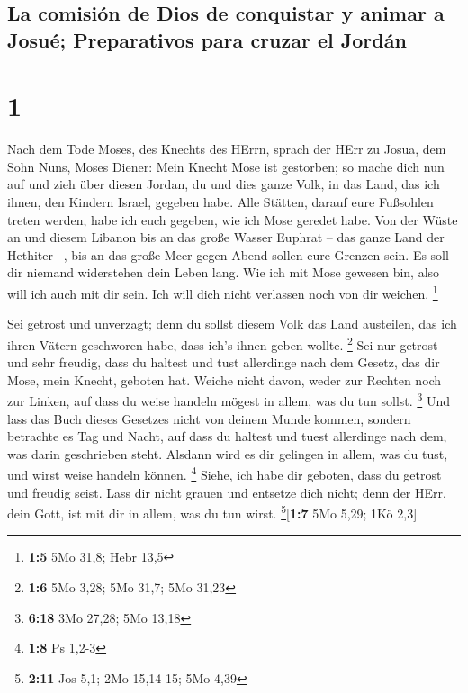 \hypertarget{la-comisiuxf3n-de-dios-de-conquistar-y-animar-a-josuuxe9-preparativos-para-cruzar-el-jorduxe1n}{%
\subsection{La comisión de Dios de conquistar y animar a Josué;
Preparativos para cruzar el
Jordán}\label{la-comisiuxf3n-de-dios-de-conquistar-y-animar-a-josuuxe9-preparativos-para-cruzar-el-jorduxe1n}}

\hypertarget{section}{%
\section{1}\label{section}}

 Nach dem Tode Moses, des Knechts des HErrn, sprach der
HErr zu Josua, dem Sohn Nuns, Moses Diener:  Mein Knecht
Mose ist gestorben; so mache dich nun auf und zieh über diesen Jordan,
du und dies ganze Volk, in das Land, das ich ihnen, den Kindern Israel,
gegeben habe.  Alle Stätten, darauf eure Fußsohlen treten
werden, habe ich euch gegeben, wie ich Mose geredet habe. 
Von der Wüste an und diesem Libanon bis an das große Wasser Euphrat --
das ganze Land der Hethiter --, bis an das große Meer gegen Abend sollen
eure Grenzen sein.  Es soll dir niemand widerstehen dein
Leben lang. Wie ich mit Mose gewesen bin, also will ich auch mit dir
sein. Ich will dich nicht verlassen noch von dir weichen. \footnote{\textbf{1:5}
  5Mo 31,8; Hebr 13,5}

 Sei getrost und unverzagt; denn du sollst diesem Volk das
Land austeilen, das ich ihren Vätern geschworen habe, dass ich's ihnen
geben wollte. \footnote{\textbf{1:6} 5Mo 3,28; 5Mo 31,7; 5Mo 31,23}
 Sei nur getrost und sehr freudig, dass du haltest und
tust allerdinge nach dem Gesetz, das dir Mose, mein Knecht, geboten hat.
Weiche nicht davon, weder zur Rechten noch zur Linken, auf dass du weise
handeln mögest in allem, was du tun sollst. \footnote{\textbf{6:18} 3Mo
  27,28; 5Mo 13,18}  Und lass das Buch dieses Gesetzes
nicht von deinem Munde kommen, sondern betrachte es Tag und Nacht, auf
dass du haltest und tuest allerdinge nach dem, was darin geschrieben
steht. Alsdann wird es dir gelingen in allem, was du tust, und wirst
weise handeln können. \footnote{\textbf{1:8} Ps 1,2-3} 
Siehe, ich habe dir geboten, dass du getrost und freudig seist. Lass dir
nicht grauen und entsetze dich nicht; denn der HErr, dein Gott, ist mit
dir in allem, was du tun wirst. \footnote{\textbf{2:11} Jos 5,1; 2Mo
  15,14-15; 5Mo 4,39}{[}\textbf{1:7} 5Mo 5,29; 1Kö 2,3{]}

